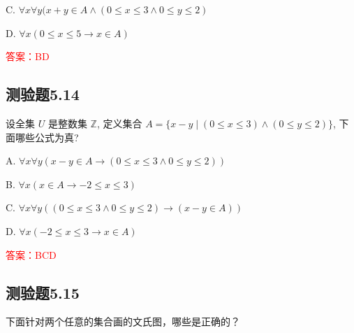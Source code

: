 \documentclass[UTF8, heading=true]{ctexart}
\begin{document}
C. $\forall x \forall y(x+y \in A \wedge(0 \leq x \leq 3 \wedge 0 \leq y \leq 2)$

D. $\forall x(0 \leq x \leq 5 \rightarrow x \in A)$

\textcolor{red}{答案：BD}


\subsection{测验题5.14}
设全集 $U$ 是整数集 $\mathbb{Z}$, 定义集合 $A=\{x-y \mid(0 \leq x \leq 3) \wedge(0 \leq y \leq 2)\}$, 下面哪些公式为真?

A. 
$
\forall x \forall y(x-y \in A \rightarrow(0 \leq x \leq 3 \wedge 0 \leq y \leq 2))
$

B. 
$
\forall x(x \in A \rightarrow-2 \leq x \leq 3)
$

C. 
$
\forall x \forall y((0 \leq x \leq 3 \wedge 0 \leq y \leq 2) \rightarrow(x-y \in A))
$

D. 
$
\forall x(-2 \leq x \leq 3 \rightarrow x \in A)
$

\textcolor{red}{答案：BCD}

\subsection{测验题5.15}

下面针对两个任意的集合画的文氏图，哪些是正确的？
\end{document}
